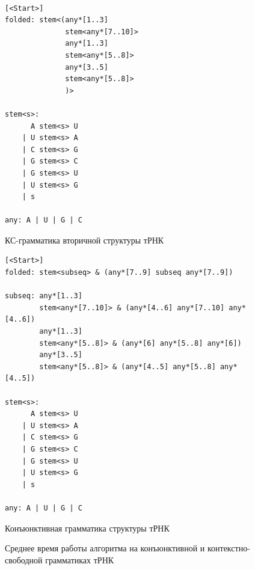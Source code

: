 \documentclass[14pt]{matmex-diploma}
\begin{document}
\begin{figure}[h]
\begin{center}
\begin{verbatim}

[<Start>]
folded: stem<(any*[1..3] 
              stem<any*[7..10]> 
              any*[1..3] 
              stem<any*[5..8]> 
              any*[3..5] 
              stem<any*[5..8]>
              )>

stem<s>: 
      A stem<s> U
    | U stem<s> A
    | C stem<s> G
    | G stem<s> C
    | G stem<s> U
    | U stem<s> G
    | s

any: A | U | G | C

\end{verbatim}
\caption{КС-грамматика вторичной структуры тРНК}
\label{TRNAgrammar}
\end{center}
\end{figure}

\begin{figure}
\begin{center}
\begin{verbatim}
[<Start>]
folded: stem<subseq> & (any*[7..9] subseq any*[7..9])

subseq: any*[1..3] 
        stem<any*[7..10]> & (any*[4..6] any*[7..10] any*[4..6])
        any*[1..3] 
        stem<any*[5..8]> & (any*[6] any*[5..8] any*[6])
        any*[3..5] 
        stem<any*[5..8]> & (any*[4..5] any*[5..8] any*[4..5])
        
stem<s>:
      A stem<s> U
    | U stem<s> A
    | C stem<s> G
    | G stem<s> C
    | G stem<s> U
    | U stem<s> G
    | s

any: A | U | G | C

\end{verbatim}
\caption{Конъюнктивная грамматика структуры тРНК}
\label{TRNAgrammarConj}
\end{center}
\end{figure}


\begin{figure}
\begin{center}
\end{center}
\caption{Среднее время работы алгоритма на конъюнктивной и контекстно-свободной грамматиках тРНК}
\label{time}
\end{figure}
\end{document}
